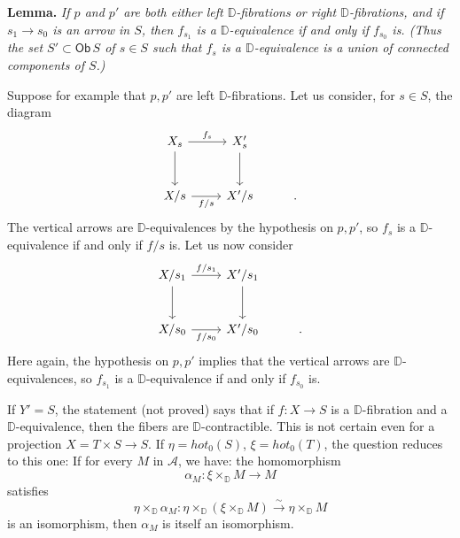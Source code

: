 \documentclass[11pt]{article}
\newcommand{\printedpage}[1]{\marginpar{\footnotesize p.~#1}}
\newcommand{\msp}[1]{\marginpar{\footnotesize [#1]}}
\newcommand{\DD}{\mathbb{D}}
\newcommand{\Ob}{\mathsf{Ob}}
\begin{document}
\textbf{Lemma.} \textit{If $p$ and $p'$ are both either left $\DD$-fibrations or right $\DD$-fibrations, and if $s_1 \to s_0$ is an arrow in $S$, then $f_{s_1}$ is a $\DD$-equivalence if and only if $f_{s_0}$ is. (Thus the set $S' \subset \Ob\, S$ of $s \in S$ such that $f_s$ is a $\DD$-equivalence is a union of connected components of $S$.)}

\indent Suppose for example that $p,p'$ are left $\DD$-fibrations. Let us consider, for $s \in S$, the diagram
\[
\begin{tikzcd}[row sep=large]
X_s \arrow[r, "f_s"] \arrow[d] & X'_s \arrow[d] \\
X/s \arrow[r, "f/s"'] & X'/s & .
\end{tikzcd}
\]
The vertical arrows are $\DD$-equivalences by the hypothesis on $p,p'$, so $f_s$ is a $\DD$-equivalence if and only if $f/s$ is. Let us now consider
\[
\begin{tikzcd}[row sep=large]
X/s_1 \arrow[r, "f/s_1"] \arrow[d] & X'/s_1 \arrow[d] \\
X/s_0 \arrow[r, "f/s_0"'] & X'/s_0 & .
\end{tikzcd}
\]
Here again, the hypothesis on $p,p'$ implies that the vertical arrows are $\DD$-equivalences, so $f_{s_1}$ is a $\DD$-equivalence if and only if $f_{s_0}$ is.

\msp{page 86}

If $Y' = S$, the statement (not proved) says that if $f : X \to S$ is a $\DD$-fibration and a $\DD$-equivalence, then the fibers are $\DD$-contractible. This is not certain even for a projection $X = T \times S \to S$. If $\eta = \mathit{hot}_0(S)$, $\xi = \mathit{hot}_0(T)$, the question reduces to this one: If for every $M$ in $\mathcal{A}$, we have: the homomorphism
\[
\alpha_M : \xi \times_{\DD} M \longrightarrow M
\]
\printedpage{53}
satisfies
\[
\eta \times_{\DD} \alpha_M : \eta \times_{\DD} (\xi \times_{\DD} M) \xrightarrow{\sim} \eta \times_{\DD} M
\]
is an isomorphism, then $\alpha_M$ is itself an isomorphism.

\msp{page 87}
\end{document}
